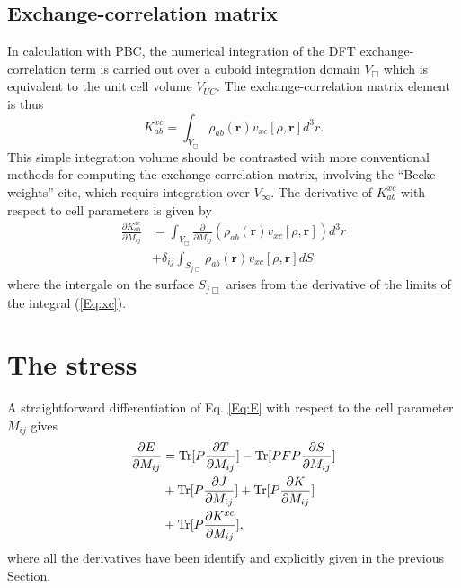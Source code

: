 \documentclass[pra,aps,twocolumn,showkeys,twocolumngrid,superbib]{revtex4}
\def\r{\mathbf{r}}
\def\Tr{{\rm Tr}}
\begin{document}
\subsection{Exchange-correlation matrix}
In calculation with PBC, the numerical integration of the DFT 
exchange-correlation term is carried out over a cuboid 
integration domain $V_{\Box}$ which is equivalent to the unit 
cell volume $V_{UC}$. The exchange-correlation matrix element is thus
\begin{equation}\label{Eq:xc}
  K_{ab}^{xc}=\int_{V_\Box}\rho_{ab}(\r)v_{xc}[\rho,\r]d^3r.
\end{equation}
This simple integration volume should be contrasted with more 
conventional methods for computing the exchange-correlation matrix, involving
the ``Becke weights'' cite, which requirs integration over $V_\infty$.
The derivative of $K_{ab}^{xc}$ with respect to cell parameters is given by
\begin{equation}
  \begin{split}
    \frac{\partial K_{ab}^{xc}}{\partial M_{ij}}&=
    \int_{V_{\Box}}\frac{\partial}{\partial M_{ij}}(\rho_{ab}(\r)v_{xc}[\rho,\r])d^3r\\
    &+\delta_{ij}\int_{S_{j\Box}}\rho_{ab}(\r)v_{xc}[\rho,\r]dS
  \end{split}
\end{equation}
where the intergale on the surface $S_{j\Box}$ arises 
from the derivative of the limits of the integral (\ref{Eq:xc}).



\section{The stress}

A straightforward differentiation of Eq. \ref{Eq:E} with respect to 
the cell parameter $M_{ij}$ gives
\begin{equation}
  \begin{split}
    \frac{\partial E}{\partial M_{ij}}&=\Tr[P\frac{\partial T}{\partial M_{ij}}]
    -\Tr[PFP\frac{\partial S}{\partial M_{ij}}]\\
    &+\Tr[P\frac{\partial J}{\partial M_{ij}}]+\Tr[P\frac{\partial K}{\partial M_{ij}}]\\
    &+\Tr[P\frac{\partial K^{xc}}{\partial M_{ij}}],
  \end{split}
\end{equation}
where all the derivatives have been identify and 
explicitly given in the previous Section.
\end{document}
